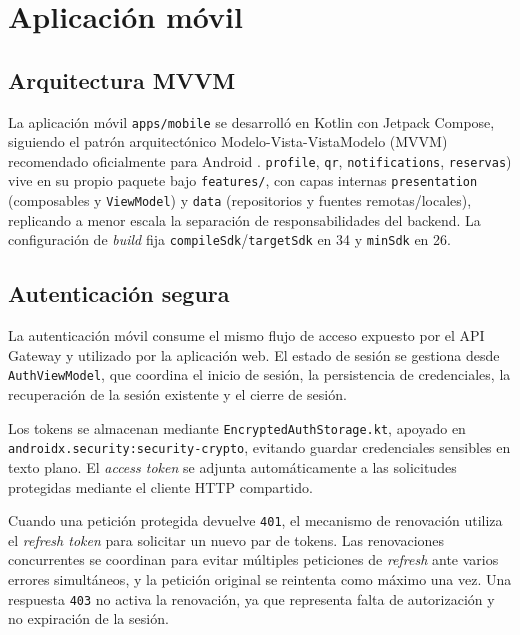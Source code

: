 \section{Aplicación móvil}
\label{sec:aplicacion-movil}

\subsection{Arquitectura MVVM}

La aplicación móvil \texttt{apps/mobile} se desarrolló en Kotlin con
Jetpack Compose, siguiendo el patrón arquitectónico Modelo-Vista-VistaModelo
(MVVM) recomendado oficialmente para Android \cite{android2024architecture}.
\texttt{profile}, \texttt{qr}, \texttt{notifications}, \texttt{reservas})
vive en su propio paquete bajo \texttt{features/}, con capas internas
\texttt{presentation} (composables y \texttt{ViewModel}) y \texttt{data}
(repositorios y fuentes remotas/locales), replicando a menor escala la
separación de responsabilidades del backend. La configuración de
\emph{build} fija \texttt{compileSdk}/\texttt{targetSdk} en 34 y
\texttt{minSdk} en 26.

\subsection{Autenticación segura}

La autenticación móvil consume el mismo flujo de acceso expuesto por el
API Gateway y utilizado por la aplicación web. El estado de sesión se
gestiona desde \texttt{AuthViewModel}, que coordina el inicio de sesión,
la persistencia de credenciales, la recuperación de la sesión existente
y el cierre de sesión.

Los tokens se almacenan mediante \texttt{EncryptedAuthStorage.kt},
apoyado en \texttt{androidx.security:security-crypto}, evitando guardar
credenciales sensibles en texto plano. El \emph{access token} se adjunta
automáticamente a las solicitudes protegidas mediante el cliente HTTP
compartido.

Cuando una petición protegida devuelve \texttt{401}, el mecanismo de
renovación utiliza el \emph{refresh token} para solicitar un nuevo par
de tokens. Las renovaciones concurrentes se coordinan para evitar múltiples
peticiones de \emph{refresh} ante varios errores simultáneos, y la petición
original se reintenta como máximo una vez. Una respuesta \texttt{403} no
activa la renovación, ya que representa falta de autorización y no expiración
de la sesión.


